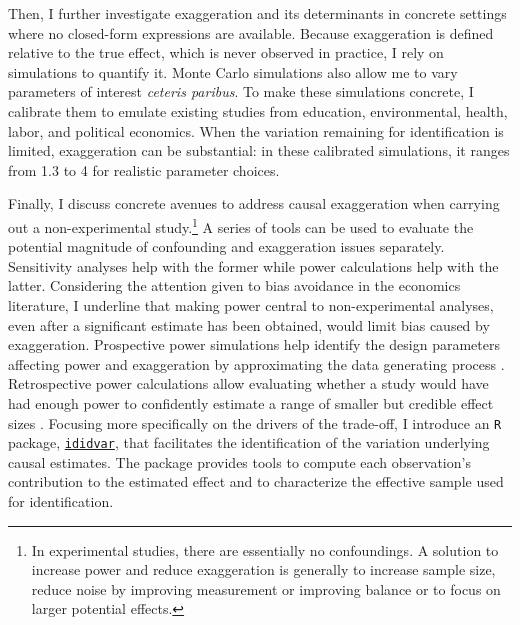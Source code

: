 			Then, I further investigate exaggeration and its determinants in concrete settings where no closed-form expressions are available. Because exaggeration is defined relative to the true effect, which is never observed in practice, I rely on simulations to quantify it. Monte Carlo simulations also allow me to vary parameters of interest \textit{ceteris paribus}. To make these simulations concrete, I calibrate them to emulate existing studies from education, environmental, health, labor, and political economics. When the variation remaining for identification is limited, exaggeration can be substantial: in these calibrated simulations, it ranges from 1.3 to 4 for realistic parameter choices.
			
			Finally, I discuss concrete avenues to address causal exaggeration when carrying out a non-experimental study.\footnote{In experimental studies, there are essentially no confoundings. A solution to increase power and reduce exaggeration is generally to increase sample size, reduce noise by improving measurement or improving balance or to focus on larger potential effects.} A series of tools can be used to evaluate the potential magnitude of confounding and exaggeration issues separately. Sensitivity analyses help with the former while power calculations help with the latter. %
			Considering the attention given to bias avoidance in the economics literature, I underline that making power central to non-experimental analyses, even after a significant estimate has been obtained, would limit bias caused by exaggeration. Prospective power simulations help identify the design parameters affecting power and exaggeration by approximating the data generating process \citep{gelman_regression_2020, black_simulated_2022}. Retrospective power calculations allow evaluating whether a study would have had enough power to confidently estimate a range of smaller but credible effect sizes \citep{gelman_beyond_2014, stommesReliability2023}.
			Focusing more specifically on the drivers of the trade-off, I introduce an \verb?R? package, \href{https://vincentbagilet.github.io/ididvar/}{\verb?ididvar?}, that facilitates the identification of the variation underlying causal estimates. The package provides tools to compute each observation’s contribution to the estimated effect and to characterize the effective sample used for identification.
						
